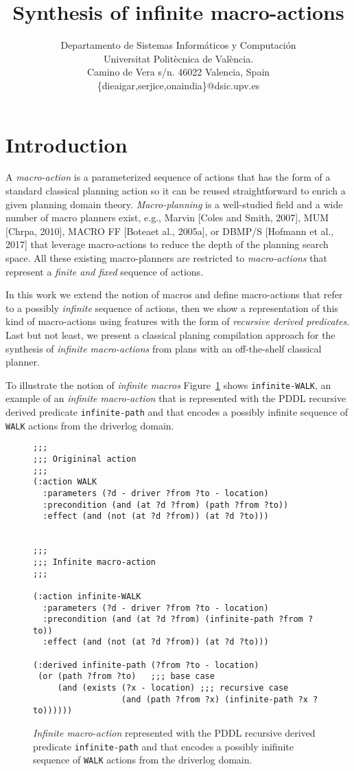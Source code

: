 \documentclass[letterpaper]{article} %
\title{Synthesis of infinite macro-actions}
\author{
Departamento de Sistemas Inform\'aticos y Computaci\'on\\
Universitat Polit\`ecnica de Val\`encia.\\
Camino de Vera s/n. 46022 Valencia, Spain\\
\{dieaigar,serjice,onaindia\}@dsic.upv.es}
\begin{document}
\maketitle
\begin{abstract}
\end{abstract}

\section{Introduction}
\label{sec:introduction}
A {\em macro-action} is a parameterized sequence of actions that has the form of a standard classical planning action so it can be reused straightforward to enrich a given planning domain theory. {\em Macro-planning} is a well-studied field and a wide number of macro planners exist, e.g., Marvin [Coles and Smith, 2007], MUM [Chrpa, 2010], MACRO FF [Boteaet al., 2005a], or DBMP/S [Hofmann et al., 2017] that leverage macro-actions to reduce the depth of the planning search space. All these existing macro-planners are restricted to {\em macro-actions} that represent a {\em finite and fixed} sequence of actions.

In this work we extend the notion of macros and define macro-actions that refer to a possibly {\em infinite} sequence of actions, then we show a representation of this kind of macro-actions using features with the form of {\em recursive derived predicates}. Last but not least, we present a classical planing compilation approach for the synthesis of {\em infinite macro-actions} from plans with an off-the-shelf classical planner.

To illustrate the notion of {\em infinite macros} Figure~\ref{fig:infinite-macro1} shows {\tt infinite-WALK}, an example of an {\em infinite macro-action} that is represented with the PDDL recursive derived predicate {\tt infinite-path} and that encodes a possibly infinite sequence of {\tt WALK} actions from the driverlog domain.

\begin{figure}
  \begin{tiny}
  \begin{verbatim}
;;;   
;;; Origininal action
;;; 
(:action WALK
  :parameters (?d - driver ?from ?to - location)
  :precondition (and (at ?d ?from) (path ?from ?to))
  :effect (and (not (at ?d ?from)) (at ?d ?to)))


;;; 
;;; Infinite macro-action
;;; 

(:action infinite-WALK
  :parameters (?d - driver ?from ?to - location)
  :precondition (and (at ?d ?from) (infinite-path ?from ?to))
  :effect (and (not (at ?d ?from)) (at ?d ?to)))

(:derived infinite-path (?from ?to - location)
 (or (path ?from ?to)   ;;; base case
     (and (exists (?x - location) ;;; recursive case
                  (and (path ?from ?x) (infinite-path ?x ?to)))))) 
  \end{verbatim}
  \end{tiny}
 \caption{{\em Infinite macro-action} represented with the PDDL recursive derived predicate {\tt infinite-path} and that encodes a possibly inifinite sequence of {\tt WALK} actions from the driverlog domain.}
   \label{fig:infinite-macro1}
\end{figure}
\end{document}
